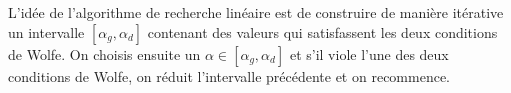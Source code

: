 L'idée de l'algorithme de recherche linéaire est de construire de manière itérative un intervalle $[ \alpha_g, \alpha_d]$ 
contenant des valeurs qui satisfassent les deux conditions de Wolfe. On choisis ensuite un $ \alpha \in [ \alpha_g, \alpha_d]$
et s'il viole l'une des deux conditions de Wolfe, on réduit l'intervalle précédente et on recommence. 


